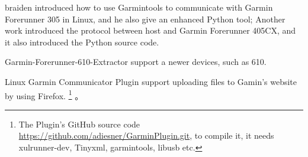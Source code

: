 \documentclass[letter,12pt,onecolumn]{article}
\newcommand{\cnt}[3]{{#1}{#2}{#3}}
\renewcommand{\cnt}[3]{#2}
\renewcommand{\cnt}[3]{#3}
\renewcommand{\cnt}[3]{#1}
\begin{document}
\cnt{braiden \cite{braiden305doc} introduced how to use Garmintools \cite{dbailegarmintools} to communicate with Garmin Forerunner 305\cite{garmin305} in Linux, and he also give an enhanced Python tool\cite{braiden405cxsrc};}
    {braiden \cite{braiden305doc} 首先描述了在 Linux 下如何使用 Garmintools \cite{dbailegarmintools} 来和 Garmin Forerunner 305\cite{garmin305} 通讯，同时他提供了增强的 Python 工具 \cite{braiden405cxsrc}；}
    {braiden \cite{braiden305doc} 首先描述了在 Linux 下如何使用 Garmintools \cite{dbailegarmintools} 來和 Garmin Forerunner 305\cite{garmin305} 通訊，同時他提供了增強的 Python 工具 \cite{braiden405cxsrc}；}
\cnt{Another work \cite{braiden405cxdoc} introduced the protocol between host and Garmin Forerunner 405\cite{garmin405}CX\cite{garmin405cx}, and it also introduced the Python source code\cite{braiden405cxsrc}.}
    {在另外一篇 \cite{braiden405cxdoc} 介绍了 Garmin Forerunner 405\cite{garmin405}CX\cite{garmin405cx} 在 Linux 下的通讯协议以及为此实现的 Python 源代码\cite{braiden405cxsrc}。}
    {在另外一篇 \cite{braiden405cxdoc} 介紹了 Garmin Forerunner 405\cite{garmin405}CX\cite{garmin405cx} 在 Linux 下的通訊協議以及為此實現的 Python 源代碼\cite{braiden405cxsrc}。}

\cnt{Garmin-Forerunner-610-Extractor \cite{gant610} support a newer devices, such as 610.}
    {Garmin-Forerunner-610-Extractor \cite{gant610} 支持一些新的设备如 610 等的文件传输。}
    {Garmin-Forerunner-610-Extractor \cite{gant610} 支持一些新的設備如 610 等的文件傳輸。}

\cnt{Linux Garmin Communicator Plugin\cite{garminwebfirefoxplugin} support uploading files to Gamin's website by using Firefox.}
    {如果需要 Firefox 支持 Garmin 的网上程序数据上传，可以使用  Linux Garmin Communicator Plugin\cite{garminwebfirefoxplugin}}
    {如果需要 Firefox 支持 Garmin 的網上程序數據上傳，可以使用  Linux Garmin Communicator Plugin\cite{garminwebfirefoxplugin}}
\cnt{\footnote{The Plugin's GitHub source code \url{https://github.com/adiesner/GarminPlugin.git}, to compile it, it needs xulrunner-dev, Tinyxml, garmintools, libusb etc.}}
    {\footnote{GitHub 上的源代码 \url{https://github.com/adiesner/GarminPlugin.git}，需要 xulrunner-dev, Tinyxml, garmintools, libusb 等支持。}}
    {\footnote{GitHub 上的源代碼 \url{https://github.com/adiesner/GarminPlugin.git}，需要 xulrunner-dev, Tinyxml, garmintools, libusb 等支持。}}
。



\end{document}
